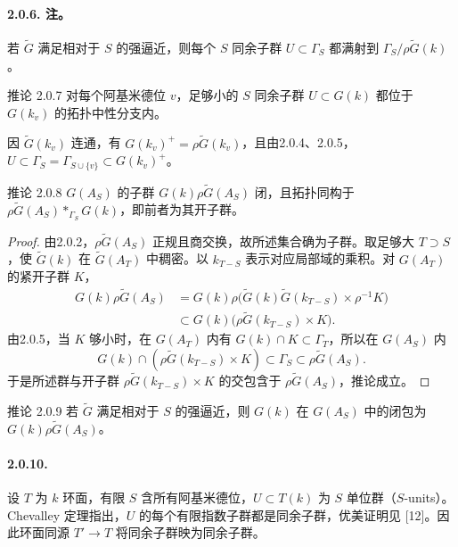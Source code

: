 \paragraph*{2.0.6. 注。} 若 $\widetilde G$ 满足相对于 $S$ 的强逼近，则每个 $S$ 同余子群 $U\subset\Gamma_S$ 都满射到 $\Gamma_S/\rho\widetilde G(k)$。
\begin{originaltheorem}{推论 2.0.7}
对每个阿基米德位 $v$，足够小的 $S$ 同余子群 $U\subset G(k)$ 都位于 $G(k_v)$ 的拓扑中性分支内。
\end{originaltheorem}
因 $\widetilde G(k_v)$ 连通，有 $G(k_v)^+=\rho\widetilde G(k_v)$，且由2.0.4、2.0.5，$U\subset\Gamma_S=\Gamma_{S\cup\{v\}}\subset G(k_v)^+$。
\begin{originaltheorem}{推论 2.0.8}
$G(A_S)$ 的子群 $G(k)\rho\widetilde G(A_S)$ 闭，且拓扑同构于 $\rho\widetilde G(A_S)*_{\Gamma_S}G(k)$，即前者为其开子群。
\end{originaltheorem}
\begin{proof}
由2.0.2，$\rho\widetilde G(A_S)$ 正规且商交换，故所述集合确为子群。取足够大 $T\supset S$，使 $\widetilde G(k)$ 在 $\widetilde G(A_T)$ 中稠密。以 $k_{T-S}$ 表示对应局部域的乘积。对 $G(A_T)$ 的紧开子群 $K$，
\[
 \begin{split}
 G(k)\rho\widetilde G(A_S)
 &=G(k)\rho\bigl(\widetilde G(k)\widetilde G(k_{T-S})\times\rho^{-1}K\bigr)\\
 &\subset G(k)\bigl(\rho\widetilde G(k_{T-S})\times K\bigr).
 \end{split}
\]
由2.0.5，当 $K$ 够小时，在 $G(A_T)$ 内有 $G(k)\cap K\subset\Gamma_T$，所以在 $G(A_S)$ 内
\[
 G(k)\cap(\rho\widetilde G(k_{T-S})\times K)\subset\Gamma_S\subset\rho\widetilde G(A_S).
\]
于是所述群与开子群 $\rho\widetilde G(k_{T-S})\times K$ 的交包含于 $\rho\widetilde G(A_S)$，推论成立。
\end{proof}
\begin{originaltheorem}{推论 2.0.9}
若 $\widetilde G$ 满足相对于 $S$ 的强逼近，则 $G(k)$ 在 $G(A_S)$ 中的闭包为 $G(k)\rho\widetilde G(A_S)$。
\end{originaltheorem}
\paragraph*{2.0.10.} 设 $T$ 为 $k$ 环面，有限 $S$ 含所有阿基米德位，$U\subset T(k)$ 为 $S$ 单位群（$S$-units）。Chevalley 定理指出，$U$ 的每个有限指数子群都是同余子群，优美证明见 [12]。因此环面同源 $T'\to T$ 将同余子群映为同余子群。
